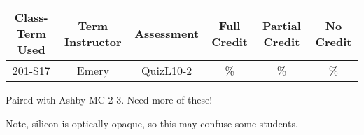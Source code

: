 \begin{outcomes}
	\begin{center}
		\begin{tabular}{ccc|ccc}
			\hline\hline
			Class-Term Used & Term Instructor & Assessment & Full Credit & Partial Credit & No Credit\\
			\hline
			201-S17 & Emery & QuizL10-2 & \% & \% & \%\\    %
		\end{tabular}
	\end{center}
\end{outcomes}

\begin{comments}

Paired with Ashby-MC-2-3. Need more of these!

Note, silicon is optically opaque, so this may confuse some students.

\end{comments}